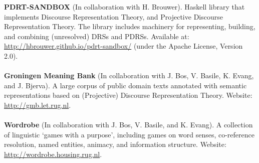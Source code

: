 \documentclass[a4paper,10pt]{article}
\def\leftcolwidth{.12\textwidth}
\begin{document}
\noindent
\textbf{PDRT-SANDBOX} (In collaboration with H. Brouwer). Haskell library that
    implements Discourse Representation Theory, and Projective Discourse
    Representation Theory. The library includes machinery for representing,
    building, and combining (unresolved) DRSs and PDRSs.
    Available at: \url{http://hbrouwer.github.io/pdrt-sandbox/} (under the
    Apache License, Version 2.0).\\
    \\
    \textbf{Groningen Meaning Bank} (In collaboration with J. Bos, V. Basile,
    K. Evang, and J. Bjerva). A large corpus of public domain texts annotated
    with semantic representations based on (Projective) Discourse Representation
    Theory. Website: \url{http://gmb.let.rug.nl}.\\
    \\
    \textbf{Wordrobe} (In collaboration with J. Bos, V. Basile, and
    K. Evang). A collection of linguistic `games with a purpose', including
    games on word senses, co-reference resolution, named entities, animacy, and
    information structure. Website: \url{http://wordrobe.housing.rug.nl}.




%
\end{document}
